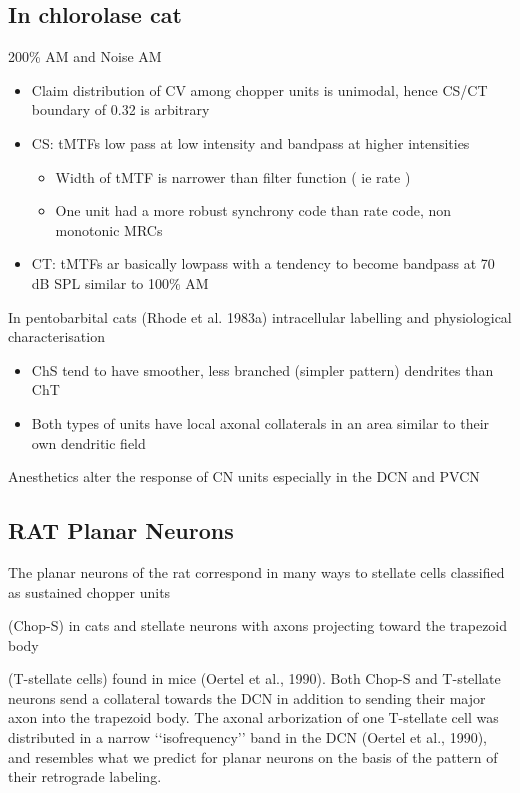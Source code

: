 \documentclass[10pt,a4paper]{article}
\begin{document}
\subsection{In chlorolase cat \citep{Rhode:1994}}
 200\% AM and Noise AM


\begin{itemize}
\item Claim distribution of CV among chopper units is unimodal, hence CS/CT
  boundary of 0.32 is arbitrary
\item CS: tMTFs low pass at low intensity and bandpass at higher intensities

  \begin{itemize}
  \item Width of tMTF is narrower than filter function ( ie rate )
  \item One unit had a more robust synchrony code than rate code, non monotonic
    MRCs
  \end{itemize}
\item CT: tMTFs ar basically lowpass with a tendency to become bandpass at 70 dB
  SPL similar to 100\% AM \citep{RhodeGreenberg:1994a}
\end{itemize}

In pentobarbital cats (Rhode et al. 1983a) intracellular labelling and
physiological characterisation


\begin{itemize}
\item ChS tend to have smoother, less branched (simpler pattern) dendrites than
  ChT
\item Both types of units have local axonal collaterals in an area similar to
  their own dendritic field
\end{itemize}
Anesthetics alter the response of CN units especially in the DCN and PVCN

\subsection{\citep{DoucetRyugo:1997} RAT Planar Neurons}

The planar neurons of the rat correspond in many ways to stellate cells
classified as sustained chopper units

(Chop-S) in cats \citep{SmithRhode:1989} and stellate neurons with axons
projecting toward the trapezoid body

(T-stellate cells) found in mice (Oertel et al., 1990). Both Chop-S and
T-stellate neurons send a collateral towards the DCN in addition to sending
their major axon into the trapezoid body. The axonal arborization of one
T-stellate cell was distributed in a narrow
{\textquoteleft}{\textquoteleft}isofrequency{\textquoteright}{\textquoteright}
band in the DCN (Oertel et al., 1990), and resembles what we predict for planar
neurons on the basis of the pattern of their retrograde labeling.
\end{document}
